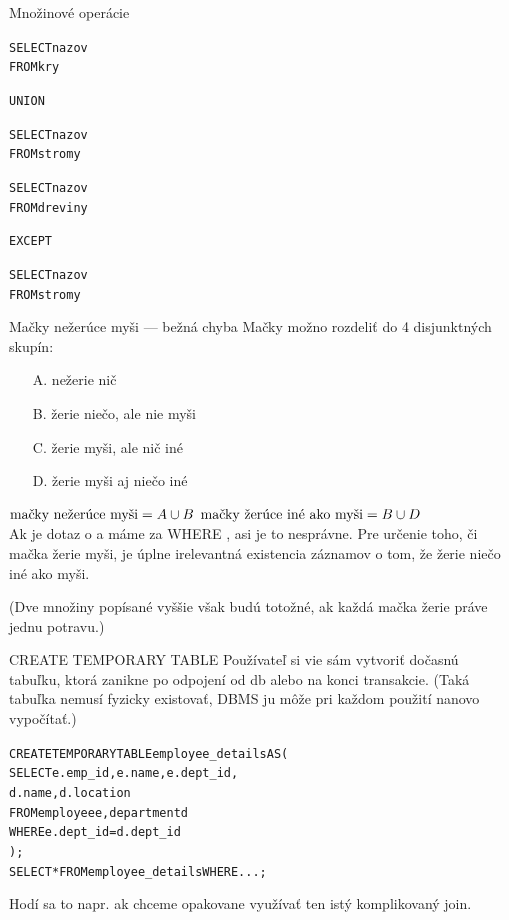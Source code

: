 \documentclass[12pt]{beamer}
\def\blue#1{\textcolor{Cerulean}{#1}}
\begin{document}
\begin{frame}[fragile]{Množinové operácie}
\begin{minipage}{.4\pdfpagewidth}
\begin{alltt}
SELECT nazov
FROM kry

\alert{UNION}

SELECT nazov
FROM stromy
\end{alltt}
\end{minipage}
\begin{minipage}{.4\pdfpagewidth}
\begin{alltt}
SELECT nazov
FROM dreviny

\alert{EXCEPT}

SELECT nazov
FROM stromy
\end{alltt}
\end{minipage}
\end{frame}

\begin{frame}[fragile]{Mačky nežerúce myši --- bežná chyba}
Mačky možno rozdeliť do 4 disjunktných skupín:
\begin{itemize}
\item[A.] nežerie nič
\item[B.] žerie niečo, ale nie myši
\item[C.] žerie myši, ale nič iné
\item[D.] žerie myši aj niečo iné
\end{itemize}
$\hbox{mačky nežerúce myši} = A\cup B$
$\hbox{mačky žerúce iné ako myši} = B\cup D$
\\[3mm]

Ak je dotaz o  a máme za WHERE , asi je to nesprávne.
Pre určenie toho, či mačka žerie myši, je úplne irelevantná existencia záznamov o tom, že žerie niečo iné ako myši.

(Dve množiny popísané vyššie však budú totožné, ak každá mačka žerie práve jednu potravu.)
\end{frame}

\begin{frame}[fragile]{CREATE TEMPORARY TABLE}
Používateľ si vie sám vytvoriť dočasnú tabuľku, ktorá zanikne po odpojení od db alebo na konci transakcie.
(Taká tabuľka nemusí fyzicky existovať, DBMS ju môže pri každom použití nanovo vypočítať.)
\begin{alltt}
\alert{CREATE TEMPORARY TABLE} \blue{employee_details} AS (
    SELECT e.emp_id, e.name, e.dept_id,
           d.name, d.location
    FROM employee e, department d
    WHERE e.dept_id = d.dept_id
);
SELECT * FROM \blue{employee_details} WHERE ...;
\end{alltt}
Hodí sa to napr. ak chceme opakovane využívať ten istý komplikovaný join.
\end{frame}
\end{document}

